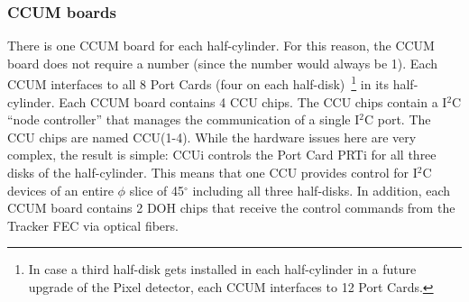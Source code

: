 \documentclass{cmspaper}
\begin{document}
%
%
%
%


\subsubsection{CCUM boards}

There is one CCUM board for each half-cylinder. 
For this reason, the CCUM board does not require a number 
(since the number would always be 1).
Each CCUM interfaces to all 8 Port Cards (four on each half-disk)~\footnote{In case a third half-disk gets installed in each half-cylinder 
in a future upgrade of the Pixel detector, each CCUM interfaces to 12 Port Cards.} 
in its half-cylinder. 
Each CCUM board contains 4 CCU chips.
The CCU chips contain a I$^2$C ``node controller'' that manages
the communication of a single I$^2$C port.
The CCU chips are named CCU(1-4).
While the hardware issues here are very complex, the result is simple:
CCUi controls  the Port Card PRTi for all three disks of the half-cylinder.
This means that one CCU provides control for I$^{2}$C devices of an entire
$\phi$ slice of 45$^{\circ}$ including all three half-disks.
In addition, each CCUM board contains 2 DOH chips that receive the control commands
from the Tracker FEC via optical fibers.
\end{document}
